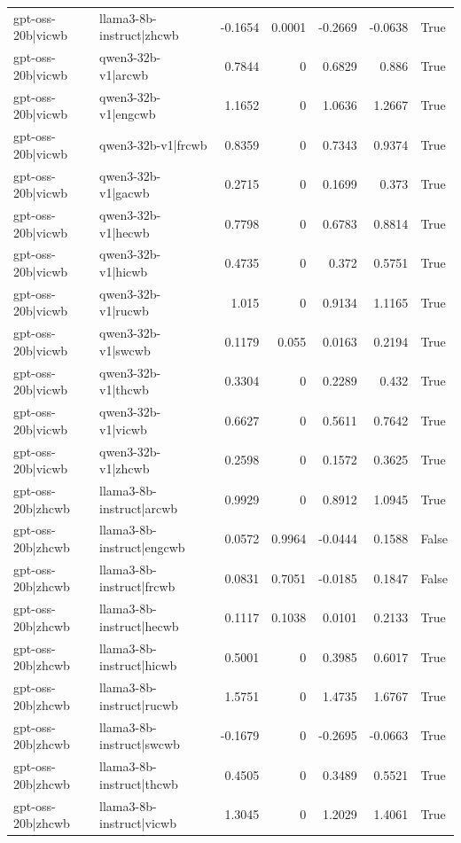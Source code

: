 \begin{table}
\begin{tabular}{l l r r r r l}
gpt-oss-20b|vicwb & llama3-8b-instruct|zhcwb & -0.1654 & 0.0001 & -0.2669 & -0.0638 & True \\
gpt-oss-20b|vicwb & qwen3-32b-v1|arcwb & 0.7844 & 0 & 0.6829 & 0.886 & True \\
gpt-oss-20b|vicwb & qwen3-32b-v1|engcwb & 1.1652 & 0 & 1.0636 & 1.2667 & True \\
gpt-oss-20b|vicwb & qwen3-32b-v1|frcwb & 0.8359 & 0 & 0.7343 & 0.9374 & True \\
gpt-oss-20b|vicwb & qwen3-32b-v1|gacwb & 0.2715 & 0 & 0.1699 & 0.373 & True \\
gpt-oss-20b|vicwb & qwen3-32b-v1|hecwb & 0.7798 & 0 & 0.6783 & 0.8814 & True \\
gpt-oss-20b|vicwb & qwen3-32b-v1|hicwb & 0.4735 & 0 & 0.372 & 0.5751 & True \\
gpt-oss-20b|vicwb & qwen3-32b-v1|rucwb & 1.015 & 0 & 0.9134 & 1.1165 & True \\
gpt-oss-20b|vicwb & qwen3-32b-v1|swcwb & 0.1179 & 0.055 & 0.0163 & 0.2194 & True \\
gpt-oss-20b|vicwb & qwen3-32b-v1|thcwb & 0.3304 & 0 & 0.2289 & 0.432 & True \\
gpt-oss-20b|vicwb & qwen3-32b-v1|vicwb & 0.6627 & 0 & 0.5611 & 0.7642 & True \\
gpt-oss-20b|vicwb & qwen3-32b-v1|zhcwb & 0.2598 & 0 & 0.1572 & 0.3625 & True \\
gpt-oss-20b|zhcwb & llama3-8b-instruct|arcwb & 0.9929 & 0 & 0.8912 & 1.0945 & True \\
gpt-oss-20b|zhcwb & llama3-8b-instruct|engcwb & 0.0572 & 0.9964 & -0.0444 & 0.1588 & False \\
gpt-oss-20b|zhcwb & llama3-8b-instruct|frcwb & 0.0831 & 0.7051 & -0.0185 & 0.1847 & False \\
gpt-oss-20b|zhcwb & llama3-8b-instruct|hecwb & 0.1117 & 0.1038 & 0.0101 & 0.2133 & True \\
gpt-oss-20b|zhcwb & llama3-8b-instruct|hicwb & 0.5001 & 0 & 0.3985 & 0.6017 & True \\
gpt-oss-20b|zhcwb & llama3-8b-instruct|rucwb & 1.5751 & 0 & 1.4735 & 1.6767 & True \\
gpt-oss-20b|zhcwb & llama3-8b-instruct|swcwb & -0.1679 & 0 & -0.2695 & -0.0663 & True \\
gpt-oss-20b|zhcwb & llama3-8b-instruct|thcwb & 0.4505 & 0 & 0.3489 & 0.5521 & True \\
gpt-oss-20b|zhcwb & llama3-8b-instruct|vicwb & 1.3045 & 0 & 1.2029 & 1.4061 & True \\

\end{tabular}
\end{table}
